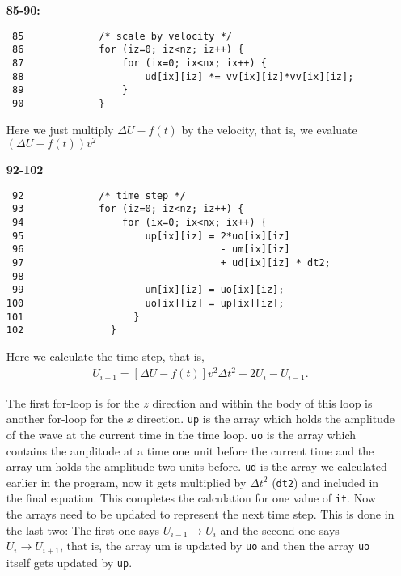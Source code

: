 \begin{itemize}
\item [\bf 85-90:]
\begin{verbatim}
 85             /* scale by velocity */
 86             for (iz=0; iz<nz; iz++) {
 87                 for (ix=0; ix<nx; ix++) {
 88                     ud[ix][iz] *= vv[ix][iz]*vv[ix][iz];
 89                 }
 90             }
\end{verbatim}

Here we just multiply $\Delta U - f(t)$  by the velocity, that is, we evaluate $(\Delta U - f(t))v^2$
\item [\bf 92-102]
\begin{verbatim}
 92             /* time step */
 93             for (iz=0; iz<nz; iz++) {
 94                 for (ix=0; ix<nx; ix++) {
 95                     up[ix][iz] = 2*uo[ix][iz] 
 96                                  - um[ix][iz] 
 97                                  + ud[ix][iz] * dt2; 
 98                           
 99                     um[ix][iz] = uo[ix][iz];
100                     uo[ix][iz] = up[ix][iz];
101                   }
102               }
\end{verbatim}

Here we calculate the time step, that is,
\begin{gather*}
    U_{i+1} = [\Delta U - f(t)]v^2\Delta t^2 + 2U_i - U_{i-1}.
\end{gather*}


The first for-loop is for the $z$ direction and within the body of this loop is another for-loop for the $x$ direction. \texttt{up} is the array which holds the amplitude of the wave at the current time in the time loop. \texttt{uo} is the array which contains the amplitude at a time one unit before the current time and the array um holds the amplitude two units before. \texttt{ud} is the array we calculated earlier in the program, now it gets multiplied by $\Delta t^2$ (\texttt{dt2}) and included in the final equation. This completes the calculation for one value of  \texttt{it}.
Now the arrays need to be updated to represent the next time step. This is done in the last two: The first one says $U_{i-1} \rightarrow U_i $ and the second one says $U_i \rightarrow U_{i+1}$, that is, the array um is updated by \texttt{uo} and then the array \texttt{uo} itself gets updated by \texttt{up}.



\end{itemize}
